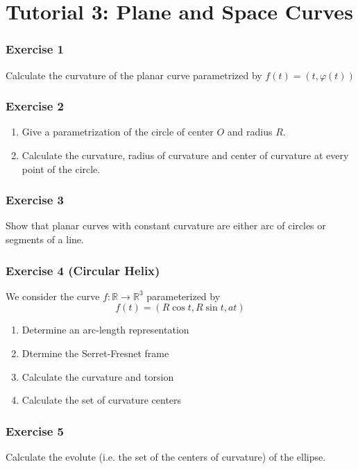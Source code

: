 \section{Tutorial 3: Plane and Space Curves}
\label{sec:Tutorial 3: Plane and Space Curves}
\subsubsection{Exercise 1}
Calculate the curvature of the planar curve parametrized by $ f(t) = \left( t, \varphi(t) \right)  $

\subsubsection{Exercise 2}
\begin{enumerate}
    \item Give a parametrization of the circle of center $ O  $ and radius $ R  $. 
    \item Calculate the curvature, radius of curvature and center of curvature at every
        point of the circle. 
\end{enumerate}

\subsubsection{Exercise 3}
Show that planar curves with constant curvature are either arc of circles or segments of a
line. 

\subsubsection{Exercise 4 (Circular Helix) }
We consider the curve $ f : \mathbb{R} \to \mathbb{R}^3 $ parameterized by 
\[
    f(t) = \left( R\cos t, R \sin t, at \right) 
\]
\begin{enumerate}
    \item Determine an arc-length representation
    \item Dtermine the Serret-Fresnet frame
    \item Calculate the curvature and torsion
    \item Calculate the set of curvature centers 
\end{enumerate}

\subsubsection{Exercise 5}
Calculate the evolute (i.e. the set of the centers of curvature) of the ellipse. 


